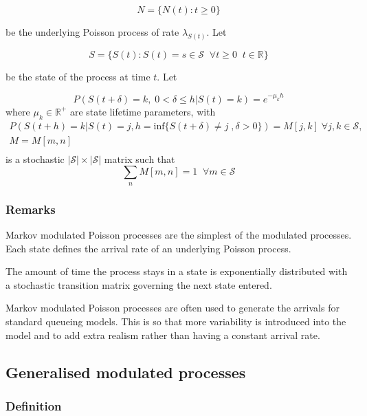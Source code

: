 \[ N = \{ N(t) : t \geq 0 \} \]

be the underlying Poisson process of rate $\lambda_{S(t)}$.  Let

\[
S = \{ S(t) : S(t) = s \in \mathcal{S} \; \; \forall t \geq 0 \; \; t \in {\mathbb R} \}
\]

be the state of the process at time $t$.  Let

\[
P(S(t+\delta) = k, \; 0 < \delta \leq h | S(t) = k) =
e^{- \mu_k h}
\]
where $\mu_k \in {\mathbb R}^+$ are state lifetime parameters, with
\[
\begin{array}{c}
P(S(t+h) = k | S(t) = j, h = \mbox{inf}\{S(t + \delta) \neq j \;,
\delta > 0\}) = M[j,k] \; \forall j,k \in {\mathcal S}, \\
M = M[m,n] \\
\end{array}
\]
is a stochastic $|\mathcal S| \times |\mathcal S|$ matrix such that
\[
\sum_n M[m,n] = 1 \; \; \forall m \in {\mathcal S}
\]

\subsubsection{Remarks}

Markov modulated Poisson processes are the simplest of the modulated
processes.  Each state defines the arrival rate of an underlying
Poisson process.

The amount of time the process stays in a state is exponentially
distributed with a stochastic transition matrix governing the next
state entered.

Markov modulated Poisson processes are often used to generate the
arrivals for standard queueing models.  This is so that more
variability is introduced into the model and to add extra realism
rather than having a constant arrival rate.

\subsection{Generalised modulated processes}
\label{models:genmodproc}

\subsubsection{Definition}

